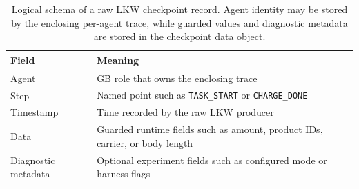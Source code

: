 \documentclass[sigconf,review,anonymous,balance=false]{acmart}
\begin{document}
\begin{table}[t]
\centering
\caption{Logical schema of a raw LKW checkpoint record. Agent identity may be
stored by the enclosing per-agent trace, while guarded values and diagnostic
metadata are stored in the checkpoint data object.}
\label{tab:lkw-schema}
\begin{tabularx}{\columnwidth}{lY}
\toprule
\textbf{Field} & \textbf{Meaning} \\
\midrule
Agent & GB role that owns the enclosing trace \\
Step & Named point such as \texttt{TASK\_START} or \texttt{CHARGE\_DONE} \\
Timestamp & Time recorded by the raw LKW producer \\
Data & Guarded runtime fields such as amount, product IDs, carrier, or body length \\
Diagnostic metadata & Optional experiment fields such as configured mode or harness flags \\
\bottomrule
\end{tabularx}
\end{table}
\end{document}
